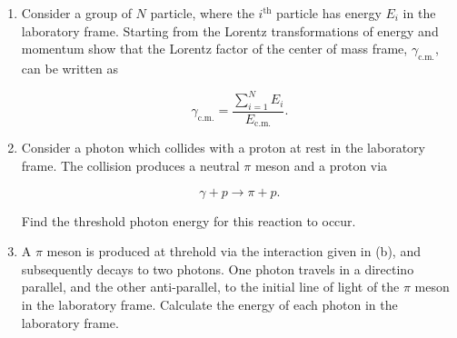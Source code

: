 \documentclass[english,a4paper,12pt]{report}
\begin{document}
{\begin{enumerate}
    \item Consider a group of \(N\) particle, where the \(i^{\text{th}} \) particle has energy \(E_{i} \) in the laboratory frame. Starting from the Lorentz transformations of energy and momentum show that the Lorentz factor of the center of mass frame, \(\gamma _{\text{c.m.} } \), can be written as 
    
    \begin{equation}
        \gamma _{\text{c.m.} } = \frac{\sum_{i=1}^{N} E_{i} }{E_{\text{c.m.} } }. 
    \end{equation}
    
    \item Consider a photon which collides with a proton at rest in the laboratory frame. The collision produces a neutral \(\pi \)  meson and a proton via 
    
    \begin{equation}
        \gamma + p \to \pi + p.
    \end{equation}
    
    Find the threshold photon energy for this reaction to occur.

    \item A \(\pi \) meson is produced at threhold via the interaction given in (b), and subsequently decays to two photons. One photon travels in a directino parallel, and the other anti-parallel, to the initial line of light of the \(\pi \) meson in the laboratory frame. Calculate the energy of each photon in the laboratory frame.     
\end{enumerate}
~
}
\end{document}
